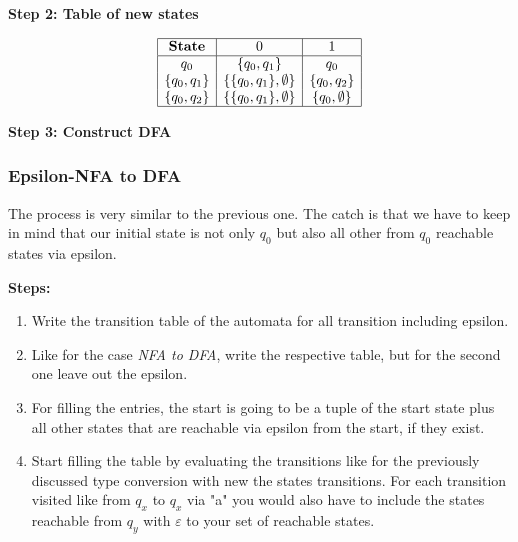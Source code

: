 \textbf{Step 2: Table of new states}

\[
    \begin{array}{|c|c|c|}
    \hline
    \textbf{State} & 0              & 1    \\
    \hline
    q_0            & \{q_0, q_1\} & q_0  \\
    \{q_0, q_1\}   & \{\{q_0, q_1\}, \emptyset \} & \{q_0, q_2\}  \\
    \{q_0, q_2\}   & \{\{q_0, q_1\}, \emptyset \} &  \{q_0, \emptyset \}\\
    \hline
    \end{array}
\]

\textbf{Step 3: Construct DFA}

\begin{center}
\end{center}

\subsubsection{Epsilon-NFA to DFA}

The process is very similar to the previous one. The catch is that we have to keep in mind that 
our initial state is not only \(q_0\) but also all other from \(q_0\) reachable states via epsilon.

\textbf{Steps:}

\begin{enumerate}
    
    \item Write the transition table of the automata for all transition including epsilon.

    \item Like for the case \emph{NFA to DFA}, write the respective 
          table, but for the second one leave out the epsilon.

    \item For filling the entries, the start is going to be a tuple of 
          the start state plus all other states that are reachable via epsilon from the start, if they 
          exist.

    \item Start filling the table by evaluating the transitions like for the previously discussed type 
          conversion with new the states transitions. For each transition visited like from \(q_x\) to 
          \(q_x\) via "a" you would also have to include the states reachable from \(q_y\) with \(\varepsilon\) 
          to your set of reachable states.

\end{enumerate}

